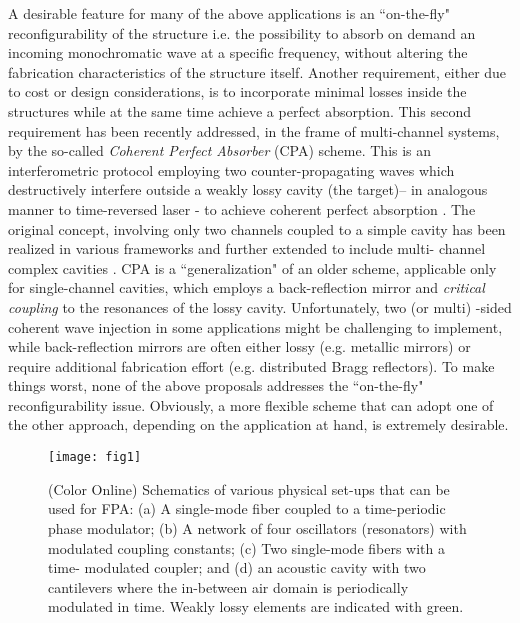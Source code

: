 \documentclass[aps,prl,twocolumn,showpacs,groupedaddress,amsmath,amssymb]{revtex4}
\begin{document}
A desirable feature for many of the above applications is an ``on-the-fly" reconfigurability of the structure i.e. the possibility to absorb 
on demand an incoming monochromatic wave at a specific frequency, without altering the fabrication characteristics of the structure
itself. Another requirement, either due to cost or design considerations, is to incorporate minimal losses inside the structures while at 
the same time achieve a perfect absorption. This second requirement has been recently addressed, in the frame of multi-channel 
systems, by the so-called {\it Coherent Perfect Absorber} (CPA) scheme. This is an interferometric protocol employing two counter-propagating 
waves which destructively interfere outside a weakly lossy cavity (the target)-- in analogous manner to time-reversed laser - to achieve 
coherent perfect absorption \cite{CGCS10,WCGNSC11}. The original concept, involving only two channels coupled to a simple cavity 
has been realized in various frameworks \cite{WCGNSC11,SLLREK12,STLLC14,ZFYZGSF16} and further extended to include multi-
channel complex cavities \cite{LSFSK17,FSK17,LSK17}. CPA is a ``generalization" of an older scheme, applicable only for single-channel 
cavities, which employs a back-reflection mirror and {\it critical coupling} to the resonances of the lossy cavity. Unfortunately, two (or multi)
-sided coherent wave injection in some applications might be challenging to implement, while back-reflection mirrors are often either lossy 
(e.g. metallic mirrors) or require additional fabrication effort (e.g. distributed Bragg reflectors). To make things worst, none of the above 
proposals addresses the ``on-the-fly" reconfigurability issue. Obviously, a more flexible scheme that can adopt one of the other approach, 
depending on the application at hand, is extremely desirable. 

\begin{figure}
\texttt{[image: fig1]}
\caption{(Color Online) Schematics of various physical set-ups that can be used for FPA: (a) A single-mode fiber coupled to a time-periodic 
phase modulator; (b) A network of four oscillators (resonators) with modulated coupling constants; (c) Two single-mode fibers with a time-
modulated coupler; and (d) an acoustic cavity with two cantilevers where the in-between air domain is periodically modulated in time. Weakly 
lossy elements are indicated with green.  
}
\label{fig1}
\end{figure}
\end{document}
